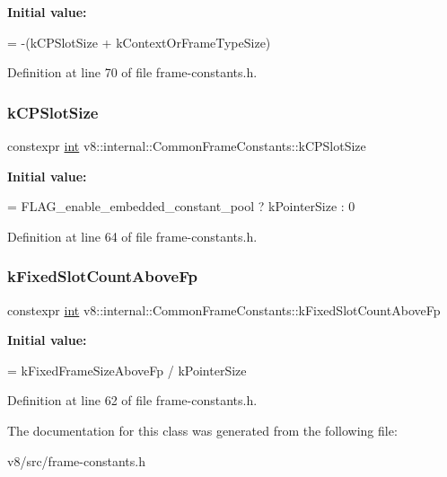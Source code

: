 {\bfseries Initial value\+:}
\begin{DoxyCode}
=
      -(kCPSlotSize + kContextOrFrameTypeSize)
\end{DoxyCode}


Definition at line 70 of file frame-\/constants.\+h.

\mbox{\label{classv8_1_1internal_1_1CommonFrameConstants_a992394389f3aa57ff16fa5ffed256c22}} 
\subsubsection{\texorpdfstring{k\+C\+P\+Slot\+Size}{kCPSlotSize}}
{\footnotesize\ttfamily constexpr \mbox{\hyperlink{classint}{int}} v8\+::internal\+::\+Common\+Frame\+Constants\+::k\+C\+P\+Slot\+Size\hspace{0.3cm}{\ttfamily [static]}}

{\bfseries Initial value\+:}
\begin{DoxyCode}
=
      FLAG\_enable\_embedded\_constant\_pool ? kPointerSize : 0
\end{DoxyCode}


Definition at line 64 of file frame-\/constants.\+h.

\mbox{\label{classv8_1_1internal_1_1CommonFrameConstants_acfbc5507a6df6d610e4311b3f139e2c0}} 
\subsubsection{\texorpdfstring{k\+Fixed\+Slot\+Count\+Above\+Fp}{kFixedSlotCountAboveFp}}
{\footnotesize\ttfamily constexpr \mbox{\hyperlink{classint}{int}} v8\+::internal\+::\+Common\+Frame\+Constants\+::k\+Fixed\+Slot\+Count\+Above\+Fp\hspace{0.3cm}{\ttfamily [static]}}

{\bfseries Initial value\+:}
\begin{DoxyCode}
=
      kFixedFrameSizeAboveFp / kPointerSize
\end{DoxyCode}


Definition at line 62 of file frame-\/constants.\+h.



The documentation for this class was generated from the following file\+:\begin{DoxyCompactItemize}
\item 
v8/src/frame-\/constants.\+h\end{DoxyCompactItemize}
